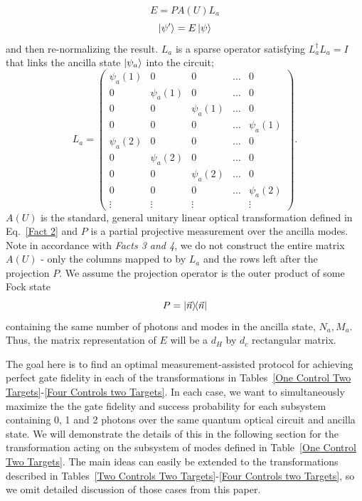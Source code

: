 \documentclass[aps,pra,twocolumn,showpacs,superscriptaddress,floatfix,10pt]{revtex4}
\begin{document}
\begin{equation}
\label{Kraus Paula Operator}
E = P A(U) L_a
\end{equation} 
\begin{equation}
\ket{\psi^\prime} = E \ket{\psi}
\end{equation}
and then re-normalizing the result.  $L_a$ is a sparse operator satisfying $L_a^\dagger L_a = I$ that links the ancilla state $\ket{\psi_a}$ into the circuit;
\begin{equation}
\label{Ancilla Linker}
L_a = \begin{pmatrix} \psi_a(1) & 0 & 0 & \dots & 0 \\
0 & \psi_a(1) & 0 & \dots & 0 \\
0 & 0 & \psi_a(1) & \dots & 0 \\
0 & 0 & 0 & \dots & \psi_a(1) \\
\psi_a(2) & 0 & 0 & \dots & 0 \\
0 & \psi_a(2) & 0 & \dots & 0 \\
0 & 0 & \psi_a(2) & \dots & 0 \\
0 & 0 & 0 & \dots & \psi_a(2) \\
\vdots & \vdots & \vdots & & \vdots \end{pmatrix} .
\end{equation}
$A(U)$ is the standard, general unitary linear optical transformation defined in Eq.~\ref{Fact 2} and $P$ is a partial projective measurement over the ancilla modes. Note in accordance with \textit{Facts 3 and 4}, we do not construct the entire matrix $A(U)$ - only the columns mapped to by $L_a$ and the rows left after the projection $P$. We assume the projection operator is the outer product of some Fock state
\begin{equation}
P = \outerproduct{\vec{n}}{\vec{n}}
\end{equation}
containing the same number of photons and modes in the ancilla state, $N_a,M_a$. Thus, the matrix representation of $E$ will be a $d_H$ by $d_c$ rectangular matrix. 

The goal here is to find an optimal measurement-assisted protocol for achieving perfect gate fidelity in each of the transformations in Tables~\ref{One Control Two Targets}-\ref{Four Controls two Targets}. In each case, we want to simultaneously maximize the the gate fidelity and success probability for each subsystem containing 0, 1 and 2 photons over the same quantum optical circuit and ancilla state. We will demonstrate the details of this in the following section for the transformation acting on the subsystem of modes defined in Table~\ref{One Control Two Targets}. The main ideas can easily be extended to the transformations described in Tables~\ref{Two Controls Two Targets}-\ref{Four Controls two Targets}, so we omit detailed discussion of those cases from this paper.
\end{document}
